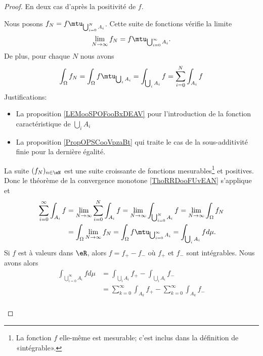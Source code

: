 \begin{proof}
	En deux cas d'après la positivité de \( f\).
	\begin{subproof}
		Nous posons \( f_N=f\mtu_{\bigcup_{i=0}^NA_i}\). Cette suite de fonctions vérifie la limite
		\begin{equation}
			\lim_{N\to \infty} f_N=f\mtu_{\bigcup_{i=0}^{\infty}A_i}.
		\end{equation}
		De plus, pour chaque \( N\) nous avons
		\begin{equation}
			\int_{\Omega}f_N=\int_{\Omega}f\mtu_{\bigcup_iA_i}=\int_{\bigcup_iA_i}f=\sum_{i=0}^N\int_{A_i}f
		\end{equation}
		Justifications:
		\begin{itemize}
			\item La proposition \ref{LEMooSPOFooBxDEAV} pour l'introduction de la fonction caractéristique de \( \bigcup_iA_i\)
			\item La proposition \ref{PropOPSCooVpzaBt} qui traite le cas de la sous-additivité finie pour la dernière égalité.
		\end{itemize}
		La suite \( (f_N)_{n\in \eN}\) est une suite croissante de fonctions mesurables\footnote{La fonction \( f\) elle-même est mesurable; c'est inclus dans la définition de «intégrable».} et positives. Donc le théorème de la convergence monotone \ref{ThoRRDooFUvEAN} s'applique et
		\begin{subequations}
			\begin{align}
				\sum_{i=0}^{\infty}\int_{A_i}f & =\lim_{N\to \infty} \sum_{i=0}^N\int_{A_i}f
				=\lim_{N\to \infty} \int_{\bigcup_{i=0}^{N}A_i}f
				=\lim_{N\to \infty} \int_{\Omega}f_N                                         \\
				                               & =\int_{\Omega}\lim_{N\to \infty} f_N
				=\int_{\Omega}f\mtu_{\bigcup_{i=0}^{\infty}A_i}
				=\int_{\bigcup_iA_i}fd\mu.
			\end{align}
		\end{subequations}
		Si \( f\) est à valeurs dans \( \eR\), alors \( f=f_{+}-f_{-}\) où \( f_{+}\) et \( f_{-}\) sont intégrables. Nous avons alors
		\begin{subequations}
			\begin{align}
				\int_{\bigcup_{i=0}^{\infty}A_i}fd\mu & =\int_{\bigcup_iA_i}f_{+}-\int_{\bigcup_iA_i}f_{-}                                             \\
				                                      & =\sum_{k=0}^{\infty}\int_{A_k}f_+- \sum_{k=0}^{\infty}  \int_{A_k} f_-                         \\

\end{align}
\end{subequations}
\end{subproof}
\end{proof}

